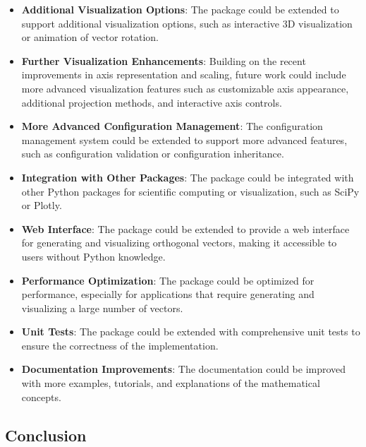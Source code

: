 \begin{itemize}
    \item \textbf{Additional Visualization Options}: The package could be extended to support additional visualization options, such as interactive 3D visualization or animation of vector rotation.
    
    \item \textbf{Further Visualization Enhancements}: Building on the recent improvements in axis representation and scaling, future work could include more advanced visualization features such as customizable axis appearance, additional projection methods, and interactive axis controls.
    
    \item \textbf{More Advanced Configuration Management}: The configuration management system could be extended to support more advanced features, such as configuration validation or configuration inheritance.
    
    \item \textbf{Integration with Other Packages}: The package could be integrated with other Python packages for scientific computing or visualization, such as SciPy or Plotly.
    
    \item \textbf{Web Interface}: The package could be extended to provide a web interface for generating and visualizing orthogonal vectors, making it accessible to users without Python knowledge.
    
    \item \textbf{Performance Optimization}: The package could be optimized for performance, especially for applications that require generating and visualizing a large number of vectors.
    
    \item \textbf{Unit Tests}: The package could be extended with comprehensive unit tests to ensure the correctness of the implementation.
    
    \item \textbf{Documentation Improvements}: The documentation could be improved with more examples, tutorials, and explanations of the mathematical concepts.
\end{itemize}

\subsection{Conclusion}

